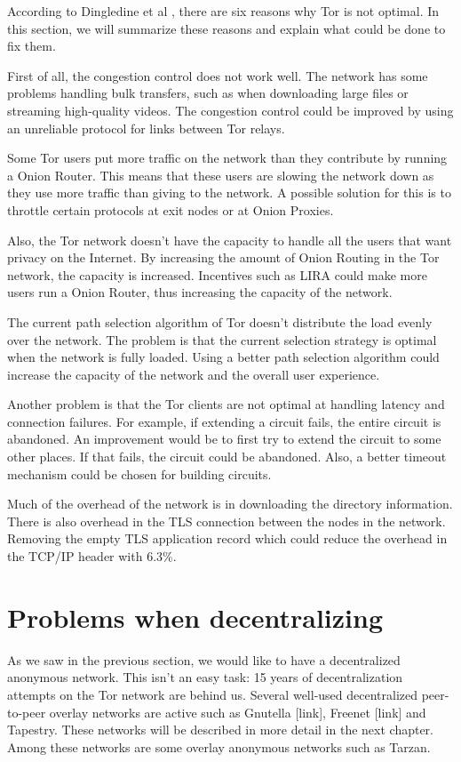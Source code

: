 \documentclass[journal]{IEEEtran}
\begin{document}
		According to Dingledine et al \cite{dingledine2009performance}, there are six reasons why Tor is not optimal. In this section, we will summarize these reasons and explain what could be done to fix them.
		
		First of all, the congestion control does not work well. The network has some problems handling bulk transfers, such as when downloading large files or streaming high-quality videos. The congestion control could be improved by using an unreliable protocol for links between Tor relays.		
		
		Some Tor users put more traffic on the network than they contribute by running a Onion Router. This means that these users are slowing the network down as they use more traffic than giving to the network. A possible solution for this is to throttle certain protocols at exit nodes or at Onion Proxies.
		
		Also, the Tor network doesn't have the capacity to handle all the users that want privacy on the Internet. By increasing the amount of Onion Routing in the Tor network, the capacity is increased. Incentives such as LIRA \cite{jansen13lira} could make more users run a Onion Router, thus increasing the capacity of the network.		
		
		The current path selection algorithm of Tor doesn't distribute the load evenly over the network. The problem is that the current selection strategy is optimal when the network is fully loaded. Using a better path selection algorithm could increase the capacity of the network and the overall user experience.		
		
		Another problem is that the Tor clients are not optimal at handling latency and connection failures. For example, if extending a circuit fails, the entire circuit is abandoned. An improvement would be to first try to extend the circuit to some other places. If that fails, the circuit could be abandoned. Also, a better timeout mechanism could be chosen for building circuits.		
		
		Much of the overhead of the network is in downloading the directory information. There is also overhead in the TLS connection between the nodes in the network. Removing the empty TLS application record which could reduce the overhead in the TCP/IP header with 6.3\%.

\section{Problems when decentralizing}
		As we saw in the previous section, we would like to have a decentralized anonymous network. This isn't an easy task: 15 years of decentralization attempts on the Tor network are behind us. Several well-used decentralized peer-to-peer overlay networks are active such as Gnutella [link], Freenet [link] and Tapestry. These networks will be described in more detail in the next chapter. Among these networks are some overlay anonymous networks such as Tarzan.
\end{document}

